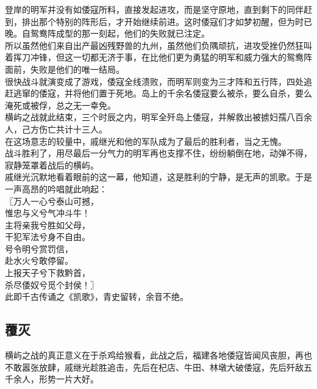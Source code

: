 \begin{multicols}{\theparacolNo}
登岸的明军并没有如倭寇所料，直接发起进攻，而是坚守原地，直到剩下的同伴赶到，排出那个特别的阵形后，才开始继续前进。这时倭寇们才如梦初醒，但为时已晚。自鸳鸯阵成型的那一刻起，他们的失败就已注定。\\

所以虽然他们来自出产最凶残野兽的九州，虽然他们负隅顽抗，进攻受挫仍然狂叫着挥刀冲锋，但这一切都无济于事，在比他们更为勇猛的明军和威力强大的鸳鸯阵面前，失败是他们的唯一结局。\\

很快战斗就演变成了游戏，倭寇全线溃败，而明军则变为三才阵和五行阵，四处追赶逃窜的倭寇，并将他们置于死地。岛上的千余名倭寇要么被杀，要么自杀，要么淹死或被俘，总之无一幸免。\\

横屿之战就此结束，三个时辰之内，明军全歼岛上倭寇，并解救出被掳妇孺八百余人，己方伤亡共计十三人。\\

在这场意志的较量中，戚继光和他的军队成为了最后的胜利者，当之无愧。\\

战斗胜利了，用尽最后一分气力的明军再也支撑不住，纷纷躺倒在地，动弹不得，寂静笼罩着战后的横屿。\\

戚继光沉默地看着眼前的这一幕，他知道，这是胜利的宁静，是无声的凯歌。于是一声高昂的吟唱就此响起：\\

〖万人一心兮泰山可撼，\\

惟忠与义兮气冲斗牛！\\

主将亲我兮胜如父母，\\

干犯军法兮身不自由。\\

号令明兮赏罚信，\\

赴水火兮敢停留。\\

上报天子兮下救黔首，\\

杀尽倭奴兮觅个封侯！〗\\

此即千古传诵之《凯歌》，青史留转，余音不绝。\\

\subsection{覆灭}
横屿之战的真正意义在于杀鸡给猴看，此战之后，福建各地倭寇皆闻风丧胆，再也不敢嚣张放肆，戚继光趁胜追击，先后在杞店、牛田、林墩大破倭寇，先后歼敌五千余人，形势一片大好。\\


\end{multicols}
